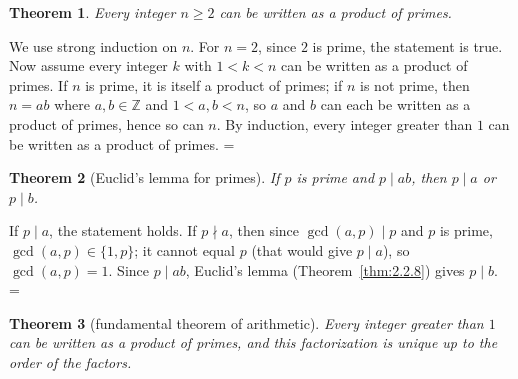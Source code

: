 \documentclass[11pt]{article}
\makeatletter
\let\nt@closedisplay\]
\def\nt@guardedclose{\@ifnextchar\par{\nt@closeafterpar}{\@ifnextchar\end{\postdisplaypenalty\@M\nt@closedisplay}{\nt@closedisplay}}}
\def\nt@closeafterpar\par{\@ifnextchar\par{\nt@closeafterpar}{\@ifnextchar\end{\postdisplaypenalty\@M\nt@closedisplay\par}{\nt@closedisplay\par}}}
\renewenvironment{proof}[1][\proofname]{\par
  \pushQED{\qed}\normalfont\topsep\medskipamount\edef\nt@afterproof{\@endparpenalty=\the\@endparpenalty\relax}\@beginparpenalty\@M\@endparpenalty\@M\let\]\nt@guardedclose\trivlist\item[]\textit{#1\@addpunct{.}} \ignorespaces}{\ifvmode\addpenalty\@M\fi\popQED\nt@afterproof\endtrivlist\@endpefalse}
\theoremstyle{ntstyle}
\newtheorem{theorem}{Theorem}[subsection]
\makeatother
\begin{document}
\begin{theorem}\label{thm:2.3.1} Every integer $n\ge2$ can be written as a
  product of primes.

\end{theorem}

\begin{proof} We use strong induction on $n$. For $n = 2$,
  since $2$ is prime, the statement is true. Now assume
  every integer $k$ with $1 < k < n$ can be written as a product of
  primes. If $n$ is prime, it is itself a product of
  primes; if $n$ is not prime, then $n = ab$ where $a, b \in \mathbb{Z}$ and $1 < a, b < n$, so $a$ and $b$ can
  each be written as
  a product of primes, hence so can $n$. By induction, every integer
  greater than $1$ can be written as a product of primes.
\end{proof}

\begin{theorem}[Euclid's lemma for primes]\label{thm:2.3.2}\label{thm:euclid-lemma-for-primes}
  If $p$ is prime and $p \mid ab$, then $p \mid a$ or $p \mid b$.

\end{theorem}

\begin{proof} If $p \mid a$, the statement holds. If $p \nmid a$, then since $\gcd(a, p) \mid p$ and $p$ is prime, $\gcd(a, p) \in \{1, p\}$; it cannot equal $p$ (that would give $p \mid a$), so
  $\gcd(a, p)=1$. Since $p \mid ab$, Euclid's lemma (Theorem~\ref{thm:2.2.8}) gives
  $p \mid b$.
\end{proof}

\begin{theorem}[fundamental theorem of arithmetic]\label{thm:2.3.3}\label{thm:fundamental-theorem-of-arithmetic}
  Every integer greater than $1$ can be written as a product of primes, and
  this factorization is unique up to the order of the factors.

\end{theorem}
\end{document}
